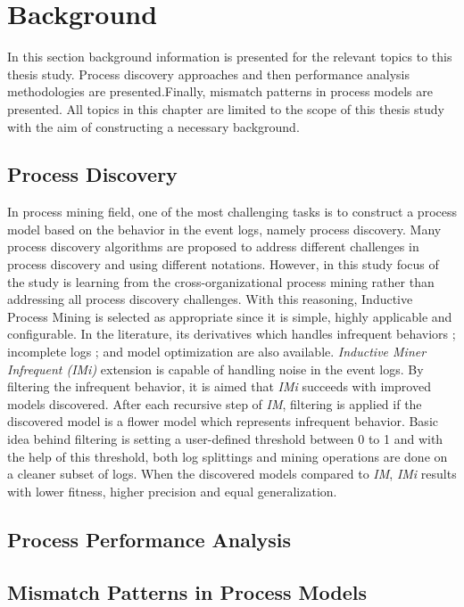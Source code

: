 \section{Background}
\label{sec:background}

In this section background information is presented for the relevant topics to this thesis study. Process discovery approaches and then performance analysis methodologies are presented.Finally, mismatch patterns in process models are presented. All topics in this chapter are limited to the scope of this thesis study with the aim of constructing a necessary background.

\subsection{Process Discovery}
\label{subsec:process-discovery}
In process mining field, one of the most challenging tasks is to construct a process model based on the behavior in the event logs, namely process discovery. Many process discovery algorithms are proposed to address different challenges in process discovery and using different notations. However, in this study focus of the study is learning from the cross-organizational process mining rather than addressing all process discovery challenges. With this reasoning, Inductive Process Mining \cite{leemans2013discovering} is selected as appropriate since it is simple, highly applicable and configurable. In the literature, its derivatives which handles infrequent behaviors \cite{leemans2014discoveringinfrequent}; incomplete logs \cite{leemans2014discoveringincomplete}; and model optimization \cite{weidlich2012profiles} are also available. \textit{Inductive Miner Infrequent (IMi)} \cite{leemans2014discoveringinfrequent} extension is capable of handling noise in the event logs. By filtering the infrequent behavior, it is aimed that \textit{IMi} succeeds with improved models discovered. After each recursive step of \textit{IM}, filtering is applied if the discovered model is a flower model which represents infrequent behavior. Basic idea behind filtering is setting a user-defined threshold between 0 to 1 and with the help of this threshold, both log splittings and mining operations are done on a cleaner subset of logs. When the discovered models compared to \textit{IM}, \textit{IMi} results with lower fitness, higher precision and equal generalization.


\subsection{Process Performance Analysis}
\label{subsec:process-performance-analysis}

\subsection{Mismatch Patterns in Process Models}
\label{subsec:mismatch-patterns-in-process-models}